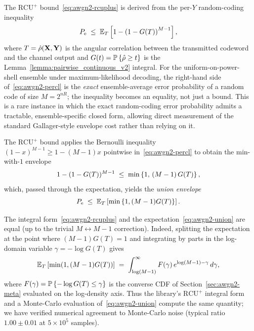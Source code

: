 The $\mathrm{RCU}^+$ bound~\eqref{eq:awgn2-rcuplus} is derived from the per-$Y$ random-coding inequality
\begin{equation}\label{eq:awgn2-percl}
	P_{\mathrm{e}} \;\leq\; \mathbb{E}_{T} \left[ 1 - \left( 1-G(T) \right)^{M-1} \right],
\end{equation}
where $T = \hat\rho(\textbf{X}, \textbf{Y})$ is the angular correlation between the transmitted codeword and the channel output and $G(t) = \mathbb{P}\left\{ \hat\rho \ge t \right\}$ is the Lemma~\ref{lemma:pairwise_continuous_v2} integral.  For the uniform-on-power-shell ensemble under maximum-likelihood decoding, the right-hand side of~\eqref{eq:awgn2-percl} is the \emph{exact} ensemble-average error probability of a random code of size $M = 2^{nR}$; the inequality becomes an equality, not just a bound.  This is a rare instance in which the exact random-coding error probability admits a tractable, ensemble-specific closed form, allowing direct measurement of the standard Gallager-style envelope cost rather than relying on it.

The $\mathrm{RCU}^+$ bound applies the Bernoulli inequality $(1-x)^{M-1} \ge 1 - (M-1) x$ pointwise in~\eqref{eq:awgn2-percl} to obtain the min-with-$1$ envelope
\begin{equation}\label{eq:awgn2-envelope}
	1 - (1-G(T))^{M-1} \;\leq\; \min\left\{ 1,\,(M-1) \, G(T) \right \},
\end{equation}
which, passed through the expectation, yields the \emph{union envelope}
\begin{equation}\label{eq:awgn2-union}
	P_{\mathrm{e}} \;\leq\; \mathbb{E}_{T} \left[ \min\left\{ 1,(M-1) G(T) \right \} \right].
\end{equation}

\begin{remark}
The integral form~\eqref{eq:awgn2-rcuplus} and the expectation~\eqref{eq:awgn2-union} are equal (up to the trivial $M \leftrightarrow M-1$ correction).  Indeed, splitting the expectation at the point where $(M-1) G(T) = 1$ and integrating by parts in the log-domain variable $\gamma = -\log G(T)$ gives
\begin{equation*}
	\mathbb{E}_{T} \left[ \min(1, (M-1) G(T)) \right] \;=\; \int_{\log(M-1)}^{\infty} F(\gamma) \, e^{\log(M-1) - \gamma}\, d\gamma,
\end{equation*}
where $F(\gamma) = \mathbb{P}\left\{ -\log G(T) \le \gamma \right\}$ is the converse CDF of Section~\ref{sec:awgn2-meta} evaluated on the log-density axis.  Thus the library's $\mathrm{RCU}^+$ integral form and a Monte-Carlo evaluation of~\eqref{eq:awgn2-union} compute the same quantity; we have verified numerical agreement to Monte-Carlo noise (typical ratio $1.00 \pm 0.01$ at $5\!\times\!10^5$ samples).
\end{remark}

